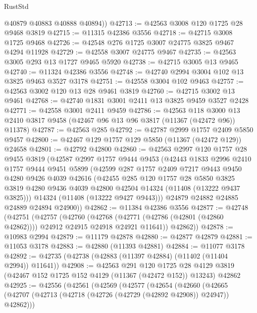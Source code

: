\begin{lexlean}{RustStd}
\begin{coremodule}
        @40879
        @40883
        @40888
        @40894))
@42713 := @42563 @3008 @120 @1725 @28 @9468 @3819
@42715 := @11315 @42386 @3556
@42718 := @42715 @3008 @1725 @9468
@42726 := @42548 @276 @1725 @3007 @24775 @3825 @9467 @4294 @11928
@42729 := @42558 @3007 @24775 @9467
@42735 := @42563 @3005 @293 @13 @1727 @9465 @5920
@42738 := @42715 @3005 @13 @9465
@42740 := @11324 @42386 @3556
@42748 := @42740 @2994 @3004 @102 @13 @3825 @9463 @3527 @3178
@42751 := @42558 @3004 @102 @9463
@42757 := @42563 @3002 @120 @13 @28 @9461 @3819
@42760 := @42715 @3002 @13 @9461
@42768 := @42740 @1831 @3001 @2411 @13 @3825 @9459 @3527 @2428
@42771 := @42558 @3001 @2411 @9459
@42786 := @42563
    @118
    @3000
    @13
    @2410
    @3817
    @9458
    (@42467 @96 @13 @96 @3817 (@11367 (@42472 @96)) @11378)
@42787 := @42563 @285
@42792 := @42787 @2999 @1757 @2409 @5850 @9457
@42800 := @42467 @129 @1757 @129 @5850 (@11367 (@42472 @129)) @24658
@42801 := @42792 @42800
@42860 := @42563
    @2997
    @120
    @1757
    @28
    @9455
    @3819
    (@42587
      @2997
      @1757
      @9444
      @9453
      (@42443
        @1833
        @2996
        @2410
        @1757
        @9444
        @9451
        @5899
        (@42599
          @287
          @1757
          @2409
          @7217
          @9443
          @9450
          @4280
          @9426
          @4039
          @42616
          (@42455
            @285
            @120
            @1757
            @28
            @5850
            @3825
            @3819
            @4280
            @9436
            @4039
            @42800
            @42504
            @14324
            (@11408 (@13222 @9437 @3825)))
          @14324
          (@11408 (@13222 @9427 @9443)))
        @24879
        @24882
        @24885
        @24889
        @24894
        @24900))
@42862 := @11384 @42386 @3556
@42877 := @42748
    (@42751
      (@42757
        (@42760
          (@42768 (@42771 (@42786 (@42801 (@42860 @42862)))) @24912 @24915 @24918 @24921 @11641))
        @42862))
@42878 := @10983 @2994
@42879 := @11179 @42878
@42880 := @42877 @42879
@42881 := @11053 @3178
@42883 := @42880 (@11393 @42881)
@42884 := @11077 @3178
@42892 := @42735 (@42738 (@42883 (@11397 @42884) (@11402 (@11404 @2994)) @11641))
@42908 := @42563
    @291
    @120
    @1725
    @28
    @4129
    @3819
    (@42467 @152 @1725 @152 @4129 (@11367 (@42472 @152)) @13243)
    @42862
@42925 := @42556
    (@42561
      (@42569
        (@42577
          (@42654
            (@42660
              (@42665 (@42707 (@42713 (@42718 (@42726 (@42729 (@42892 @42908)) @24947)) @42862)))

\end{coremodule}
\end{lexlean}
